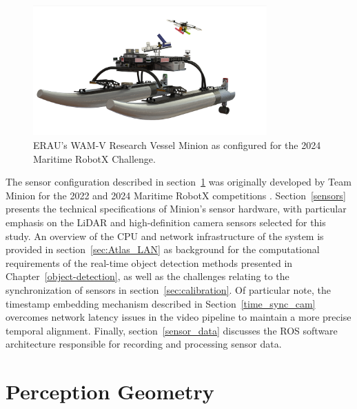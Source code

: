 \documentclass{erauthesis}
\begin{document}
\begin{figure}[t]
\centering
\includegraphics[width=0.8\textwidth]{Images/Minion.png}
\caption{ERAU's \ac{WAM-V} Research Vessel Minion as configured for the 2024 Maritime RobotX Challenge.}
\label{fig:minion}
\end{figure}

The sensor configuration described in section~\ref{perception_geometry} was originally developed by Team Minion for the 2022 and 2024 Maritime RobotX competitions \cite{holland2024, thompson2023}. Section~\ref{sensors} presents the technical specifications of Minion's sensor hardware, with particular emphasis on the \ac{LiDAR} and high-definition camera sensors selected for this study.
An overview of the CPU and network infrastructure of the system is provided in section~\ref{sec:Atlas_LAN} as background for the computational requirements of the real-time object detection methods presented in Chapter~\ref{object-detection}, as well as the challenges relating to the synchronization of sensors in section~\ref{sec:calibration}.
Of particular note, the timestamp embedding mechanism described in Section~\ref{time_sync_cam} overcomes network latency issues in the video pipeline to maintain a more precise temporal alignment.
Finally, section~\ref{sensor_data} discusses the \ac{ROS} software architecture responsible for recording and processing sensor data.

\section{Perception Geometry} \label{perception_geometry}
\end{document}
